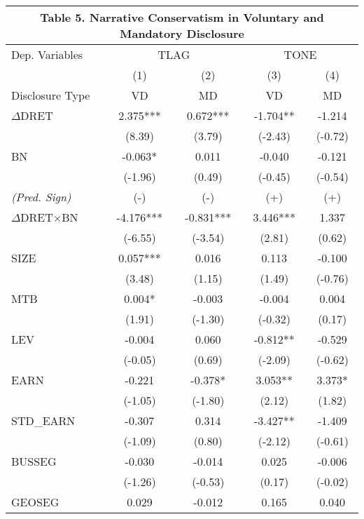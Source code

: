 \begin{table}[H] \label{T5}
	\begin{center}
		\tabcolsep=0.4cm
		\begin{tabular}{lcccc}
			\multicolumn{5}{c}{\textbf{Table 5. Narrative Conservatism in Voluntary and Mandatory Disclosure}} \\
			\toprule
			\toprule
			Dep. Variables & \multicolumn{2}{c}{TLAG} & \multicolumn{2}{c}{TONE} \\
			\cmidrule{2-5}
			& (1) & (2) & (3) & (4) \\
			Disclosure Type & VD & MD & VD & MD \\
			\midrule
			$\Delta$DRET & 2.375*** & 0.672*** & -1.704** & -1.214 \\
			& (8.39) & (3.79) & (-2.43) & (-0.72) \\
			BN & -0.063* & 0.011 & -0.040 & -0.121 \\
			& (-1.96) & (0.49) & (-0.45) & (-0.54) \\
			\rowcolor[rgb]{ .906,  .902,  .902} \textit{(Pred. Sign)} & (-) & (-) & (+) & (+) \\
			\rowcolor[rgb]{ .906,  .902,  .902} $\Delta$DRET$\times$BN & -4.176*** & -0.831*** & 3.446*** & 1.337 \\
			\rowcolor[rgb]{ .906,  .902,  .902} & (-6.55) & (-3.54) & (2.81) & (0.62) \\
			SIZE & 0.057*** & 0.016 & 0.113 & -0.100 \\
			& (3.48) & (1.15) & (1.49) & (-0.76) \\
			MTB & 0.004* & -0.003 & -0.004 & 0.004 \\
			& (1.91) & (-1.30) & (-0.32) & (0.17) \\
			LEV & -0.004 & 0.060 & -0.812** & -0.529 \\
			& (-0.05) & (0.69) & (-2.09) & (-0.62) \\
			EARN & -0.221 & -0.378* & 3.053** & 3.373* \\
			& (-1.05) & (-1.80) & (2.12) & (1.82) \\
			STD\_EARN & -0.307 & 0.314 & -3.427** & -1.409 \\
			& (-1.09) & (0.80) & (-2.12) & (-0.61) \\
			BUSSEG & -0.030 & -0.014 & 0.025 & -0.006 \\
			& (-1.26) & (-0.53) & (0.17) & (-0.02) \\
			GEOSEG & 0.029 & -0.012 & 0.165 & 0.040 \\

\end{tabular}
\end{center}
\end{table}
